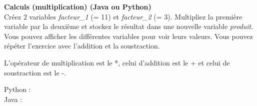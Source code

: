 \begin{Exercice}[3 minutes] \textbf{Calculs (multiplication) (Java ou Python)}\\

   Créez 2 variables \textit{facteur\_1} (= 11) et \textit{facteur\_2} (= 3). Multipliez la première variable par la deuxième et stockez le résultat dans une nouvelle variable \textit{produit}. Vous pouvez afficher les différentes variables pour voir leurs valeurs. Vous pouvez répéter l'exercice avec l'addition et la soustraction. \\
   
    \begin{conseil}
      	L'opérateur de multiplication est le *, celui d'addition est le + et celui de soustraction est le -.
        
    \end{conseil}
    \begin{solution}
    
    Python : \\
    
    
    
    Java : \\
    
    
           
    \end{solution}   
\end{Exercice}

